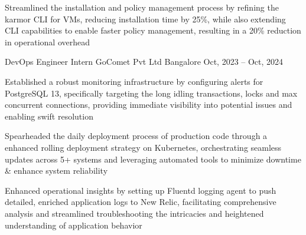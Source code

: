 \documentclass[]{awesome-cv}
\begin{document}
\begin{cventries}
{\begin{cvitems}
        \item Streamlined the installation and policy management process by refining the karmor CLI for VMs, reducing installation time by 25\%, while also extending CLI capabilities to enable faster policy management, resulting in a 20\% reduction in operational overhead
        \end{cvitems}}
    \cventry
    {DevOps Engineer Intern}
    {GoComet Pvt Ltd}
    {Bangalore}
    {Oct, 2023 – Oct, 2024}
    {\begin{cvitems}
            \item {Established a robust monitoring infrastructure by configuring alerts for PostgreSQL 13, specifically targeting the long idling transactions, locks and max concurrent connections, providing immediate visibility into potential issues and enabling swift resolution}
            \item {Spearheaded the daily deployment process of production code through a enhanced rolling deployment strategy on Kubernetes, orchestrating seamless updates across 5+ systems and leveraging automated tools to minimize downtime \& enhance system reliability}
            \item {Enhanced operational insights by setting up Fluentd logging agent to push detailed, enriched application logs to New Relic, facilitating comprehensive analysis and streamlined troubleshooting the intricacies and heightened understanding of application behavior}
        \end{cvitems}}


\end{cventries}
\end{document}
